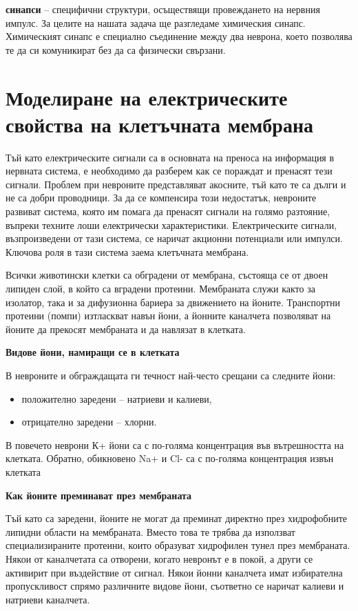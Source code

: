 \documentclass{article}
\numberwithin{equation}{section}
\begin{document}
\textbf{синапси} -- специфични структури, осъществящи провеждането на нервния импулс. За целите на нашата задача ще разгледаме химическия
синапс. Химическият синапс е специално съединение между два неврона, което позволява те да си комуникират без да са физически свързани.

\section{Моделиране на електрическите свойства на клетъчната мембрана} Тъй като електрическите сигнали са в основната на преноса на
информация в нервната система, е необходимо да разберем как се пораждат и пренасят тези сигнали. Проблем при невроните представляват
акосните, тъй като те са дълги и не са добри проводници. За да се компенсира този недостатък, невроните развиват система, която им помага да
пренасят сигнали на голямо разтояние, въпреки техните лоши електрически характеристики.  Електрическите сигнали, възпроизведени от тази
система, се наричат акционни потенциали или импулси. Ключова роля в тази система заема клетъчната мембрана.

Всички животински клетки са обградени от мембрана, състояща се от двоен липиден слой, в който са вградени протеини. Мембраната служи както
за изолатор, така и за дифузионна бариера за движението на йоните. Транспортни протеини (помпи) изтласкват навън йони, а йонните каналчета
позволяват на йоните да прекосят мембраната и да навлязат в клетката.

\vspace{5mm} %
\textbf{Видове йони, намиращи се в клетката}

В невроните и обграждащата ги течност най-често срещани са следните йони:
\begin{itemize}
  \item положително заредени -- натриеви и калиеви,
  \item отрицателно заредени -- хлорни.
\end{itemize}

В повечето неврони К+ йони са с по-голяма концентрация във вътрешността на клетката. Обратно, обикновено Na+ и Cl- са с по-голяма концентрация извън клетката

\vspace{5mm}
\textbf{Как йоните преминават през мембраната}

Тъй като са заредени, йоните не могат да преминат директно през хидрофобните липидни области на мембраната. Вместо това те трябва да
използват специализираните протеини, които образуват хидрофилен тунел през мембраната. Някои от каналчетата са отворени, когато невронът е в
покой, а други се активирит при въздействие от сигнал. Някои йонни каналчета имат избирателна пропускливост спрямо различните видове
йони, съответно се наричат калиеви и натриеви каналчета.
\end{document}

